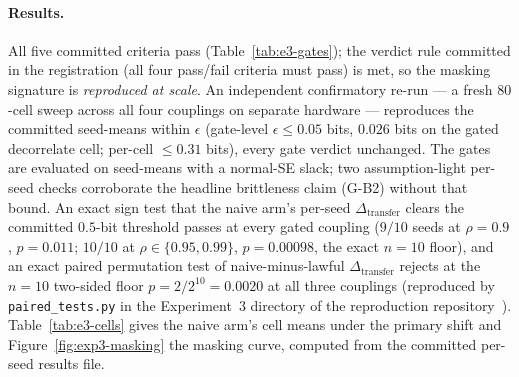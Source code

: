 \documentclass[twocolumn,10pt]{article}
\theoremstyle{definition}
\theoremstyle{remark}
\begin{document}
\paragraph{Results.} All five committed criteria pass
(Table~\ref{tab:e3-gates}); the verdict rule committed in the
registration (all four pass/fail criteria must pass) is met, so
the masking signature is \emph{reproduced at scale}. An independent
confirmatory re-run --- a fresh $80$-cell sweep across all four couplings on
separate hardware --- reproduces the committed seed-means within $\epsilon$
(gate-level $\epsilon \le 0.05$ bits, $0.026$ bits on the gated decorrelate
cell; per-cell $\le 0.31$ bits), every gate verdict unchanged.
The gates are evaluated on seed-means with a normal-SE slack; two
assumption-light per-seed checks corroborate the headline brittleness
claim (G-B2) without that bound. An exact sign test that the naive arm's
per-seed $\Delta_{\mathrm{transfer}}$ clears the committed $0.5$-bit
threshold passes at every gated coupling ($9/10$ seeds at $\rho = 0.9$,
$p = 0.011$; $10/10$ at $\rho \in \{0.95, 0.99\}$, $p = 0.00098$, the
exact $n = 10$ floor), and an exact paired permutation test of
naive-minus-lawful $\Delta_{\mathrm{transfer}}$ rejects at the $n = 10$
two-sided floor $p = 2/2^{10} = 0.0020$ at all three couplings
(reproduced by \texttt{paired\_tests.py} in the Experiment~3
directory of the reproduction repository~\cite{porepro}).
Table~\ref{tab:e3-cells} gives the
naive arm's cell means under the primary shift and
Figure~\ref{fig:exp3-masking} the masking curve, computed from the
committed per-seed results file.
\end{document}
